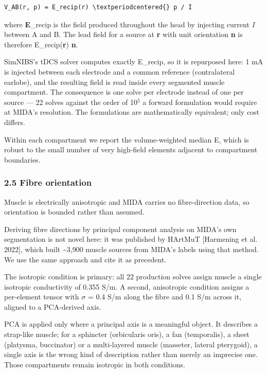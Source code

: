 \documentclass[
  11pt,
]{article}
\begin{document}
\begin{verbatim}
V_AB(r, p) = E_recip(r) \textperiodcentered{} p / I
\end{verbatim}

where \textbf{E}\_recip is the field produced throughout the head by injecting current
\emph{I} between A and B. The lead field for a source at \textbf{r} with unit orientation
\textbf{n} is therefore E\_recip(\textbf{r}) \textperiodcentered{} \textbf{n}.

SimNIBS's tDCS solver computes exactly E\_recip, so it is repurposed here: 1 mA
is injected between each electrode and a common reference (contralateral
earlobe), and the resulting field is read inside every segmented muscle
compartment. The consequence is one solve per electrode instead of one per
source --- 22 solves against the order of 10\(^{5}\) a forward formulation would require
at MIDA's resolution. The formulations are mathematically equivalent; only cost
differs.

Within each compartment we report the volume-weighted median \textbar E\textbar, which is
robust to the small number of very high-field elements adjacent to compartment
boundaries.

\subsubsection{2.5 Fibre orientation}\label{fibre-orientation}

Muscle is electrically anisotropic and MIDA carries no fibre-direction data, so
orientation is bounded rather than assumed.

Deriving fibre directions by principal component analysis on MIDA's own
segmentation is not novel here: it was published by HArtMuT {[}Harmening et al.
2022{]}, which built \textasciitilde3,900 muscle sources from MIDA's labels using that method.
We use the same approach and cite it as precedent.

The isotropic condition is primary: all 22 production solves assign muscle a
single isotropic conductivity of 0.355 S/m. A second, anisotropic condition
assigns a per-element tensor with \(\sigma\) = 0.4 S/m along the fibre and 0.1 S/m across
it, aligned to a PCA-derived axis.

PCA is applied only where a principal axis is a meaningful object. It describes
a strap-like muscle; for a sphincter (orbicularis oris), a fan (temporalis), a
sheet (platysma, buccinator) or a multi-layered muscle (masseter, lateral
pterygoid), a single axis is the wrong kind of description rather than merely an
imprecise one. Those compartments remain isotropic in both conditions.
\end{document}
